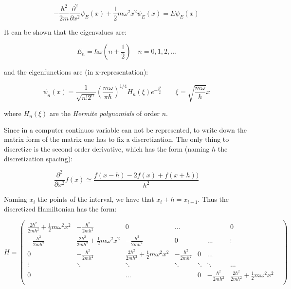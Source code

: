 \documentclass[12pt, a4paper, notitlepage]{report}
\begin{document}
$$ - \frac{\hbar^2}{2m} \frac{\partial^2 }{ \partial x^2} \psi_E (x)+ \frac{1}{2} m \omega^2 x^2 \psi_E (x) = E \psi_E (x) $$

It can be shown that the eigenvalues are:

$$ E_n = \hbar \omega \left( n + \frac{1}{2} \right) \quad n=0,1,2,... $$

and the eigenfunctions are (in x-representation):

$$ \psi_n (x) = \frac{1}{\sqrt{n! 2^n}} \left( \frac{m \omega}{\pi \hbar} \right)^{1/4} H_n(\xi) e^{-\frac{\xi^2}{2}} \qquad \xi = \sqrt{\frac{m \omega}{\hbar}} x $$

where $ H_n(\xi) $ are the \textit{Hermite polynomials} of order $n$.

Since in a computer continuos variable can not be represented, to write down the matrix form of the matrix one has to fix a discretization. The only thing to discretize is the second order derivative, which has the form (naming $h$ the discretization spacing):

$$ \frac{\partial^2 }{ \partial x^2} f(x) \simeq \frac{f(x-h) -2f(x) + f(x+h))}{h^2} $$

Naming $x_i$ the points of the interval, we have that $x_i \pm h =  x_{i \pm 1}$. Thus the discretized Hamiltonian has the form:

$$ H = \left( \begin{matrix}
	\frac{2 \hbar^2}{2m h^2} + \frac{1}{2} m \omega^2 x^2 & -\frac{\hbar^2}{2m h^2} & 0 & \dots & & & 0 \\
	-\frac{\hbar^2}{2m h^2} & \frac{2 \hbar^2}{2m h^2} + \frac{1}{2} m \omega^2 x^2 & -\frac{\hbar^2}{2m h^2} & 0 & & \dots & \vdots \\
	0 & -\frac{\hbar^2}{2m h^2} & \frac{2 \hbar^2}{2m h^2} + \frac{1}{2} m \omega^2 x^2 & -\frac{\hbar^2}{2m h^2} & 0 & \dots & \\
	\vdots & \ddots & \ddots & \ddots  & \ddots & \ddots & \dots & \\
	0 & & \dots &  & 0 & -\frac{\hbar^2}{2m h^2} & \frac{2 \hbar^2}{2m h^2} + \frac{1}{2} m \omega^2 x^2 \\
\end{matrix} \right) $$
\end{document}
